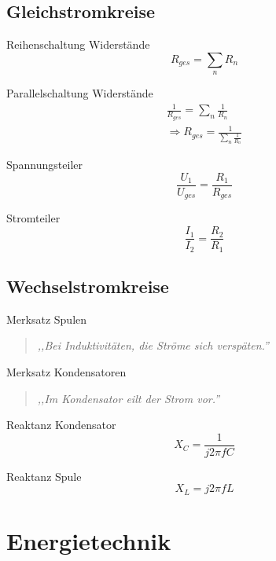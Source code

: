 \documentclass[11pt, a4paper, final, fleqn, twocolumn]{article}
\numberwithin{equation}{subsection}
\begin{document}
\subsection{Gleichstromkreise}

Reihenschaltung Widerstände
\begin{equation}
    R_{ges} = \sum_n R_n
\end{equation}

\noindent Parallelschaltung Widerstände
\begin{equation}
\begin{split}
    \frac{1}{R_{ges}} = \sum_n \frac{1}{R_n} \\
    \Rightarrow R_{ges} = \frac{1}{\sum_n \frac{1}{R_n}}
\end{split}
\end{equation}

\noindent Spannungsteiler
\begin{equation}
    \frac{U_1}{U_{ges}} = \frac{R_1}{R_{ges}}
\end{equation}

\noindent Stromteiler
\begin{equation}
    \frac{I_1}{I_2} = \frac{R_2}{R_1}
\end{equation}


\subsection{Wechselstromkreise}

Merksatz Spulen
\begin{quote}
    \textit{,,Bei Induktivitäten, die Ströme sich verspäten.''}
\end{quote}

\noindent Merksatz Kondensatoren
\begin{quote}
    \textit{,,Im Kondensator eilt der Strom vor.''}
\end{quote}

\noindent Reaktanz Kondensator
\begin{equation}
    X_C = \frac{1}{j 2\pi f C}
\end{equation}

\noindent Reaktanz Spule
\begin{equation}
    X_L = j 2\pi f L
\end{equation}



\section{Energietechnik}
\end{document}
